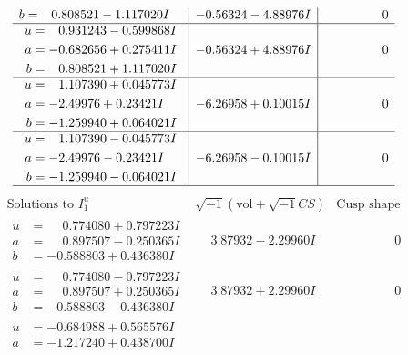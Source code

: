 \documentclass[1p]{elsarticle_modified}
\theoremstyle{definition}
\newcommand{\I}{\sqrt{-1}}
\begin{document}
$$\begin{array}{c|c|c}
\begin{aligned}
b &= \phantom{-}0.808521 - 1.117020 I\end{aligned}
 & -0.56324 - 4.88976 I & \phantom{-0.000000 } 0 \\ \hline\begin{aligned}
u &= \phantom{-}0.931243 - 0.599868 I \\
a &= -0.682656 + 0.275411 I \\
b &= \phantom{-}0.808521 + 1.117020 I\end{aligned}
 & -0.56324 + 4.88976 I & \phantom{-0.000000 } 0 \\ \hline\begin{aligned}
u &= \phantom{-}1.107390 + 0.045773 I \\
a &= -2.49976 + 0.23421 I \\
b &= -1.259940 + 0.064021 I\end{aligned}
 & -6.26958 + 0.10015 I & \phantom{-0.000000 } 0 \\ \hline\begin{aligned}
u &= \phantom{-}1.107390 - 0.045773 I \\
a &= -2.49976 - 0.23421 I \\
b &= -1.259940 - 0.064021 I\end{aligned}
 & -6.26958 - 0.10015 I & \phantom{-0.000000 } 0\\
 \hline 
 \end{array}$$\newpage$$\begin{array}{c|c|c}  
\text{Solutions to }I^u_{1}& \I (\text{vol} + \sqrt{-1}CS) & \text{Cusp shape}\\
 \hline 
\begin{aligned}
u &= \phantom{-}0.774080 + 0.797223 I \\
a &= \phantom{-}0.897507 - 0.250365 I \\
b &= -0.588803 + 0.436380 I\end{aligned}
 & \phantom{-}3.87932 - 2.29960 I & \phantom{-0.000000 } 0 \\ \hline\begin{aligned}
u &= \phantom{-}0.774080 - 0.797223 I \\
a &= \phantom{-}0.897507 + 0.250365 I \\
b &= -0.588803 - 0.436380 I\end{aligned}
 & \phantom{-}3.87932 + 2.29960 I & \phantom{-0.000000 } 0 \\ \hline\begin{aligned}
u &= -0.684988 + 0.565576 I \\
a &= -1.217240 + 0.438700 I \\

\end{aligned}
\end{array}$$
\end{document}
